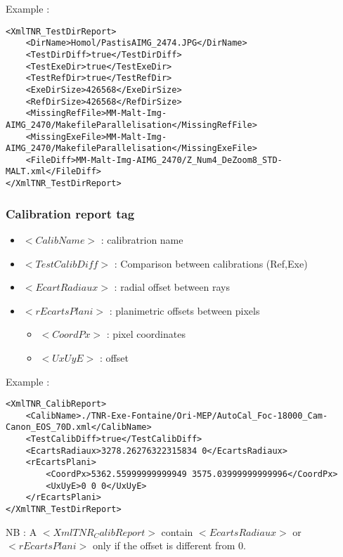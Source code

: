 \documentclass[a4paper]{book}
\begin{document}
Example : 
\begin{lstlisting}
<XmlTNR_TestDirReport>
	<DirName>Homol/PastisAIMG_2474.JPG</DirName>
	<TestDirDiff>true</TestDirDiff>
	<TestExeDir>true</TestExeDir>
	<TestRefDir>true</TestRefDir>
	<ExeDirSize>426568</ExeDirSize>
	<RefDirSize>426568</RefDirSize>
	<MissingRefFile>MM-Malt-Img-AIMG_2470/MakefileParallelisation</MissingRefFile>
	<MissingExeFile>MM-Malt-Img-AIMG_2470/MakefileParallelisation</MissingExeFile>
	<FileDiff>MM-Malt-Img-AIMG_2470/Z_Num4_DeZoom8_STD-MALT.xml</FileDiff>
</XmlTNR_TestDirReport>
\end{lstlisting}

\subsubsection{Calibration report tag}
\begin{itemize}
\item $<CalibName>$ : calibratrion name
\item $<TestCalibDiff>$ : Comparison between calibrations (Ref,Exe)
\item $<EcartRadiaux>$ : radial offset between rays
\item $<rEcartsPlani>$ : planimetric offsets between pixels
\begin{itemize}
\item $<CoordPx>$ : pixel coordinates
\item $<UxUyE>$ : offset\\
\end{itemize}
\end{itemize}

Example :
\begin{lstlisting}
<XmlTNR_CalibReport>
	<CalibName>./TNR-Exe-Fontaine/Ori-MEP/AutoCal_Foc-18000_Cam-Canon_EOS_70D.xml</CalibName>
	<TestCalibDiff>true</TestCalibDiff>
	<EcartsRadiaux>3278.26276322315834 0</EcartsRadiaux>
	<rEcartsPlani>
		<CoordPx>5362.55999999999949 3575.03999999999996</CoordPx>
		<UxUyE>0 0 0</UxUyE>
	</rEcartsPlani>
</XmlTNR_TestDirReport>
\end{lstlisting}

NB : A $<XmlTNR_CalibReport>$ contain $<EcartsRadiaux>$ or $<rEcartsPlani>$ only if the offset is different from 0.
\end{document}

